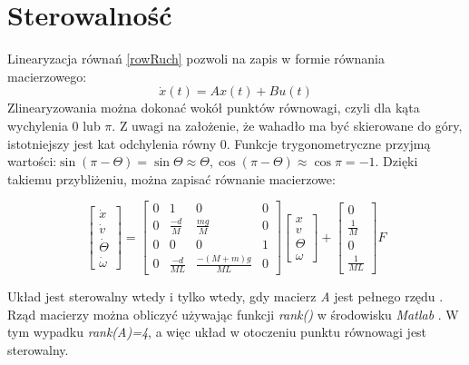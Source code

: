\section{Sterowalność}

Linearyzacja równań \ref{rowRuch} pozwoli na zapis w formie równania macierzowego:
\begin{equation}
    \dot{x}(t)=Ax(t)+Bu(t)
\end{equation}
Zlinearyzowania można dokonać wokół punktów równowagi, czyli dla kąta wychylenia 0 lub \(\pi\). Z uwagi na założenie, że wahadło ma być skierowane do góry, istotniejszy jest kat odchylenia równy 0. Funkcje trygonometryczne przyjmą wartości:\(\sin{(\pi-\Theta)}=\sin{\Theta}\approx\Theta, \cos{(\pi-\Theta)}\approx\cos{\pi}=-1 \). Dzięki takiemu przybliżeniu, można zapisać równanie macierzowe:

\begin{equation}
\begin{bmatrix}
\dot{x}\\ 
\dot{v}\\ 
\dot{\Theta}\\ 
\dot{\omega}
\end{bmatrix}
=
\begin{bmatrix}
 0&  1&  0& 0\\ 
 0&  \frac{-d}{M}&  \frac{mg}{M}& 0\\ 
 0&  0&  0& 1\\ 
 0&  \frac{-d}{ML}&  \frac{-(M+m)g}{ML}& 0
\end{bmatrix}
\begin{bmatrix}
x\\ 
v\\ 
\Theta\\
\omega
\end{bmatrix}
+
\begin{bmatrix}
0\\ 
\frac{1}{M}\\ 
0\\ 
\frac{1}{ML}
\end{bmatrix}F
\end{equation}

Układ jest sterowalny wtedy i tylko wtedy, gdy macierz \textit{A} jest pełnego rzędu \cite{Mzyk05}. Rząd macierzy można obliczyć używając funkcji \textit{rank()} w środowisku \textit{Matlab} \cite{matlab}. W tym wypadku \textit{rank(A)=4}, a więc układ w otoczeniu punktu równowagi jest sterowalny. 